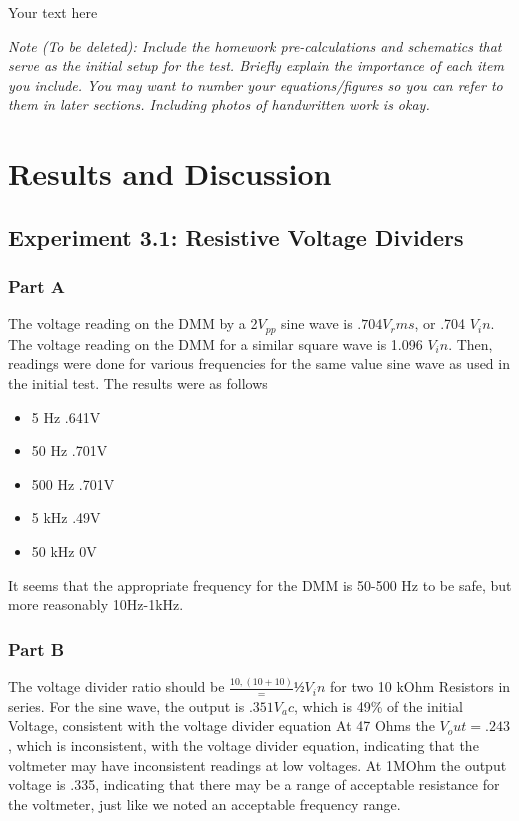 \documentclass[10pt]{article}
\begin{document}
Your text here

\medskip

\textit{Note (To be deleted): Include the homework pre-calculations and schematics that serve as the initial setup for the test. Briefly explain the importance of each item you include. You may want to number your equations/figures so you can refer to them in later sections. Including photos of handwritten work is okay.}

\section{Results and Discussion}

\subsection{Experiment 3.1: Resistive Voltage Dividers}
\subsubsection{Part A}

	 The voltage reading on the DMM by a 2$V_{pp}$ sine wave is $.704 V_rms$, or .704 $V_in$. The voltage reading on the DMM for a similar square wave is 1.096 $V_in$. Then, readings were done for various frequencies for the same value sine wave as used in the initial test. The results were as follows
\begin{itemize} 
	\item 5 Hz		.641V
	\item 50 Hz		.701V
	\item 500 Hz	.701V
	\item 5 kHz		.49V
	\item 50 kHz	0V
\end{itemize}
	It seems that the appropriate frequency for the DMM is 50-500 Hz to be safe, but more reasonably 10Hz-1kHz.
\subsubsection{Part B}
	 The voltage divider ratio should be $\frac{10,(10+10)} = ½ V_in$  for two 10 kOhm Resistors in series. For the sine wave, the output is $.351 V_ac$, which is 49\% of the initial Voltage, consistent with the voltage divider equation 
	 At 47 Ohms the $V_out = .243$, which is inconsistent, with the voltage divider equation, indicating that the voltmeter may have inconsistent readings at low voltages. 
	 At 1MOhm the output voltage is .335, indicating that there may be a range of acceptable resistance for the voltmeter, just like we noted an acceptable frequency range.
\end{document}
